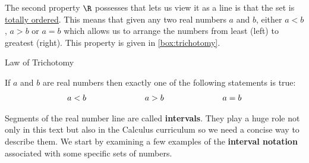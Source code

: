 The second property $\R$ possesses that lets us view it as a line is that the set is \href{http://en.wikipedia.org/wiki/Total_order}{\underline{totally ordered}}. This means that given any two real numbers $a$ and $b$, either $a < b$, $a > b$ or $a = b$ which allows us to arrange the numbers from least (left) to greatest (right). This property is given in \autoref{box:trichotomy}.


\begin{floatbox}[label=box:trichotomy]{Law of Trichotomy}

If $a$ and $b$ are real numbers then exactly one of the following statements is true: \vspace{-.15in} \[ \begin{array}{lclcl} a < b & \hspace*{0.147\textwidth} & a > b & \hspace*{0.147\textwidth} & a = b \end{array} \]

\end{floatbox}

Segments of the real number line are called \textbf{intervals}.  They play a huge role not only in this text but also in the Calculus curriculum so we need a concise way to describe them.  We start by examining a few examples of the \textbf{interval notation} associated with some specific sets of numbers.  

